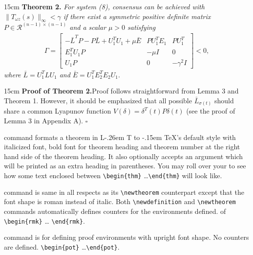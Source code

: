 \documentclass[a4paper,12pt]{article}
\makeatletter
\def\bs{\expandafter\@gobble\string\\}
\DeclareRobustCommand{\LaTeX}{L\kern-.26em%
        {\sbox\z@ T%
         \vbox to\ht\z@{\hbox{\check@mathfonts
           \fontsize\sf@size\z@
           \math@fontsfalse\selectfont
          A\,}%
         \vss}%
        }%
     \kern-.15em%
    \TeX}
\makeatother
\begin{document}
\begin{toolwrite}{15cm}
\noindent\textbf{Theorem 2.}\enspace\itshape
For system (8), consensus can be achieved with
$\|T_{\omega z}(s)\|_{\infty}<\gamma$ if there exist a symmetric
positive definite
 matrix $P\in \mathcal{R}^{(n-1)\times (n-1)}$ and a scalar $\mu>0$ satisfying
\setcounter{equation}{9}
\begin{eqnarray}\label{10}
\Gamma=\begin{bmatrix}
-\bar{L}^TP-P\bar{L}+U_1^TU_1+\mu \bar{E}&PU_1^TE_1&PU_1^T\\
E_1^TU_1P&-\mu I&0\\ U_1P&0&-\gamma^2I\end{bmatrix}<0,
\end{eqnarray}
where $\bar{L}=U_1^TLU_1$ and $\bar{E}=U_1^TE_2^TE_2U_1.$
\end{toolwrite}

\begin{toolwrite}{15cm}
\noindent\textbf{Proof of Theorem 2.}\enspace Proof follows
straightforward from Lemma 3 and Theorem 1. However, it should be
emphasized that all possible $\bar{L}_{\sigma(t)}$ should share a
common Lyapunov function $V(\delta)=\delta^T(t)P\delta(t)$ (see
the proof of Lemma 3 in Appendix A). \hfill$\square$
\end{toolwrite}

\tooltip{\ttfamily\bs newtheorem}{mytip2} command formats a
theorem in \LaTeX's default style with italicized font, bold font
for theorem heading and theorem number at the right hand side of the
theorem heading.  It also optionally accepts an argument which
will be printed as an extra heading in parentheses. You may roll
over your  to see how some text
enclosed between \verb+\begin{thm}+ \dots \verb+\end{thm}+ will
look like.

\tooltip{\ttfamily\bs newdefinition}{mytip1} command is same in
all respects as its \verb+\newtheorem+ counterpart except that
the font shape is roman instead of italic.  Both
\verb+\newdefinition+ and \verb+\newtheorem+ commands
automatically defines counters for the environments defined.
 of \verb+\begin{rmk}+ \dots
\verb+\end{rmk}+.

\tooltip{\ttfamily\bs newproof}{mytip3} command is for defining
proof environments with upright font shape.  No counters are
defined.  \verb+\begin{pot}+
\dots \verb+\end{pot}+.
\end{document}
